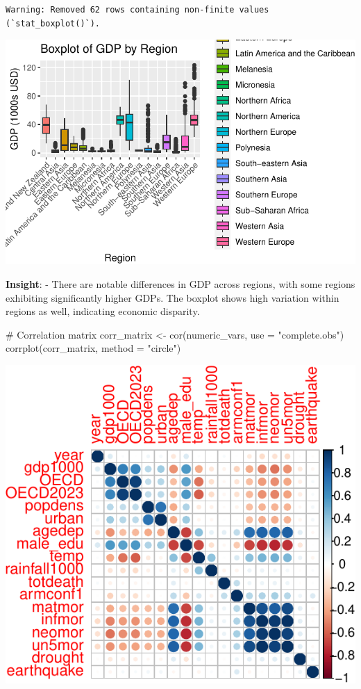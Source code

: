 \documentclass[
  letterpaper,
  DIV=11,
  numbers=noendperiod]{scrartcl}
\newenvironment{Shaded}{\begin{snugshade}}{\end{snugshade}}
\newcommand{\AttributeTok}[1]{\textcolor[rgb]{0.40,0.45,0.13}{#1}}
\newcommand{\CommentTok}[1]{\textcolor[rgb]{0.37,0.37,0.37}{#1}}
\newcommand{\FunctionTok}[1]{\textcolor[rgb]{0.28,0.35,0.67}{#1}}
\newcommand{\NormalTok}[1]{\textcolor[rgb]{0.00,0.23,0.31}{#1}}
\newcommand{\OtherTok}[1]{\textcolor[rgb]{0.00,0.23,0.31}{#1}}
\newcommand{\StringTok}[1]{\textcolor[rgb]{0.13,0.47,0.30}{#1}}
\begin{document}
\begin{verbatim}
Warning: Removed 62 rows containing non-finite values (`stat_boxplot()`).
\end{verbatim}

\includegraphics{EDA_files/figure-pdf/unnamed-chunk-5-1.pdf}

\textbf{Insight}: - There are notable differences in GDP across regions,
with some regions exhibiting significantly higher GDPs. The boxplot
shows high variation within regions as well, indicating economic
disparity.

\begin{Shaded}
\begin{Highlighting}[]
\CommentTok{\# Correlation matrix}
\NormalTok{corr\_matrix }\OtherTok{\textless{}{-}} \FunctionTok{cor}\NormalTok{(numeric\_vars, }\AttributeTok{use =} \StringTok{"complete.obs"}\NormalTok{)}
\FunctionTok{corrplot}\NormalTok{(corr\_matrix, }\AttributeTok{method =} \StringTok{"circle"}\NormalTok{)}
\end{Highlighting}
\end{Shaded}

\includegraphics{EDA_files/figure-pdf/unnamed-chunk-6-1.pdf}
\end{document}
